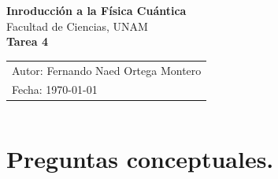 \documentclass[12pt,a4paper]{article}
\begin{document}
\begin{center}
    {\LARGE \textbf{Inroducción a la Física Cuántica}} \\[0.4cm]

    {\large Facultad de Ciencias, UNAM} \\[0.6cm]

    \large \textbf{Tarea 4} \\[0.2cm]

    \begin{tabular}{l}
        \small Autor: Fernando Naed Ortega Montero\\
        \small Fecha: \today
    \end{tabular}
\end{center}
\[\] %

\section*{Preguntas conceptuales.}
\end{document}

